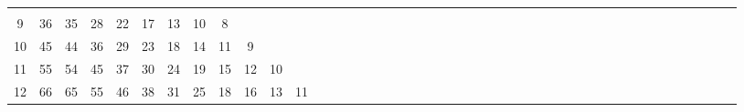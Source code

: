 \documentclass[12pt,a4paper]{amsart}
\theoremstyle{definition} %
\theoremstyle{plain} %
\begin{document}
\begin{table}[h]
{\begin{tabular}{|c|*{44}{c|}}
                               &             &             &             &             &             &             &             &             &             &             &             &             &             &             &             &             &             &             &             &             &             &             &             &             &             &             \\
                     9 &         36 &         35 &         28 &         22 &         17 &         13 &         10 &          8 &            &             &             &             &             &             &             &             &             &  
                               &             &             &             &             &             &             &             &             &             &             &             &             &             &             &             &             &             &             &             &             &             &             &             &             &             &             \\
                    10 &         45 &         44 &         36 &         29 &         23 &         18 &         14 &         11 &          9 &             &             &             &             &             &             &             &             &  
                              &             &             &             &             &             &             &             &             &             &             &             &             &             &             &             &             &             &             &             &             &             &             &             &             &             &             \\
                    11 &         55 &         54 &         45 &         37 &         30 &         24 &         19 &         15 &         12 &          10 &             &             &             &             &             &             &             &  
                              &             &             &             &             &             &             &             &             &             &             &             &             &             &             &             &             &             &             &             &             &             &             &             &             &             &             \\
                    12 &         66 &         65 &         55 &         46 &         38 &         31 &         25 &         18 &         16 &          13 &          11 &             &             &             &             &             &             &  

\end{tabular}}
\end{table}
\end{document}
